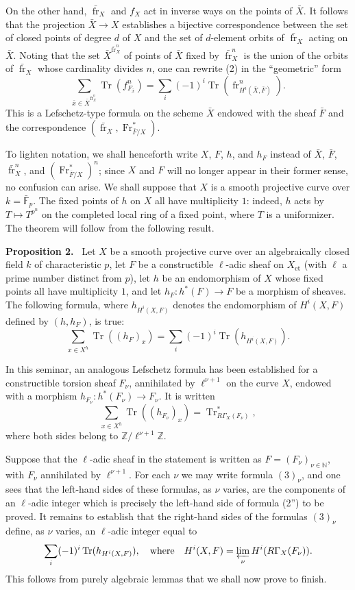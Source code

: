 \documentclass[11pt]{article}
\newenvironment{statement}[1]{\par\medskip\noindent\textbf{#1.}\ }{\par\medskip}
\providecommand{\Tr}{\operatorname{Tr}}
\providecommand{\Tr}{\operatorname{Tr}}
\providecommand{\Tr}{\operatorname{Tr}}
\providecommand{\Tr}{\operatorname{Tr}}
\providecommand{\Tr}{\operatorname{Tr}}
\providecommand{\fr}{\operatorname{fr}}
\providecommand{\Fr}{\operatorname{Fr}}
\providecommand{\Fr}{\operatorname{Fr}}
\providecommand{\fr}{\operatorname{fr}}
\begin{document}
On the other hand, $\bar{\fr}_X$ and $f_X$ act in inverse ways on the points of $\bar X$. It follows that the projection $\bar X\to X$ establishes a bijective correspondence between the set of closed points of degree $d$ of $X$ and the set of $d$-element orbits of $\bar{\fr}_X$ acting on $\bar X$. Noting that the set $\bar X^{\bar{\fr}_X^n}$ of points of $\bar X$ fixed by $\bar{\fr}_X^n$ is the union of the orbits of $\bar{\fr}_X$ whose cardinality divides $n$, one can rewrite (2) in the ``geometric'' form
\[
\sum_{\bar x\in\bar X^{\bar{\fr}_X^n}}\Tr(f_{F_{\bar x}}^n)
=\sum_i(-1)^i\Tr(\fr^n_{H^i(\bar X,\bar F)}).
\tag{2'}
\]
This is a Lefschetz-type formula on the scheme $\bar X$ endowed with the sheaf $\bar F$ and the correspondence $(\bar{\fr}_X,\Fr^*_{\bar F/X})$.

To lighten notation, we shall henceforth write $X$, $F$, $h$, and $h_F$ instead of $\bar X$, $\bar F$, $\bar{\fr}_X^n$, and $(\Fr^*_{\bar F/X})^n$; since $X$ and $F$ will no longer appear in their former sense, no confusion can arise. We shall suppose that $X$ is a smooth projective curve over $k=\bar{\mathbb F}_p$. The fixed points of $h$ on $X$ all have multiplicity $1$: indeed, $h$ acts by $T\mapsto T^{p^n}$ on the completed local ring of a fixed point, where $T$ is a uniformizer. The theorem will follow from the following result.

\begin{statement}{Proposition 2}
Let $X$ be a smooth projective curve over an algebraically closed field $k$ of characteristic $p$, let $F$ be a constructible $\ell$-adic sheaf on $X_{\mathrm{et}}$ (with $\ell$ a prime number distinct from $p$), let $h$ be an endomorphism of $X$ whose fixed points all have multiplicity $1$, and let $h_F:h^*(F)\to F$ be a morphism of sheaves. The following formula, where $h_{H^i(X,F)}$ denotes the endomorphism of $H^i(X,F)$ defined by $(h,h_F)$, is true:
\[
\sum_{x\in X^h}\Tr((h_F)_x)=\sum_i(-1)^i\Tr(h_{H^i(X,F)}).
\tag{2''}
\]
\end{statement}

In this seminar, an analogous Lefschetz formula has been established for a constructible torsion sheaf $F_\nu$, annihilated by $\ell^{\nu+1}$ on the curve $X$, endowed with a morphism $h_{F_\nu}:h^*(F_\nu)\to F_\nu$. It is written
\[
\sum_{x\in X^h}\Tr((h_{F_\nu})_x)=\Tr^*_{R\Gamma_X(F_\nu)},
\tag{3}
\]
where both sides belong to $\mathbb Z/\ell^{\nu+1}\mathbb Z$.

Suppose that the $\ell$-adic sheaf in the statement is written as $F=(F_\nu)_{\nu\in\mathbb N}$, with $F_\nu$ annihilated by $\ell^{\nu+1}$. For each $\nu$ we may write formula $(3)_\nu$, and one sees that the left-hand sides of these formulas, as $\nu$ varies, are the components of an $\ell$-adic integer which is precisely the left-hand side of formula (2'') to be proved. It remains to establish that the right-hand sides of the formulas $(3)_\nu$ define, as $\nu$ varies, an $\ell$-adic integer equal to
\[
\sum_i(-1)^i\Tr(h_{H^i(X,F)}),
\quad\text{where}\quad
H^i(X,F)=\varprojlim_\nu H^i(R\Gamma_X(F_\nu)).
\]
This follows from purely algebraic lemmas that we shall now prove to finish.
\end{document}
